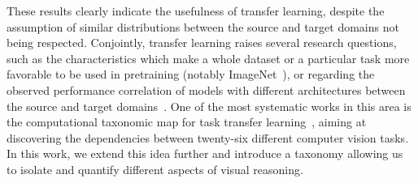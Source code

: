 These results clearly indicate the usefulness of transfer learning, despite the assumption of similar distributions between the source and target domains not being respected.
Conjointly, transfer learning raises several research questions, such as the characteristics which make a whole dataset or a particular task more favorable to be used in pretraining (notably ImageNet~\cite{huh2016makes}), or regarding the observed performance correlation of models with different architectures between the source and target domains~\cite{kornblith2019better}.
One of the most systematic works in this area is the computational taxonomic map for task transfer learning~\cite{zamir2018taskonomy}, aiming at discovering the dependencies between twenty-six different computer vision tasks.
In this work, we extend this idea further and introduce a taxonomy allowing us to isolate and quantify different aspects of visual reasoning.






%
%
